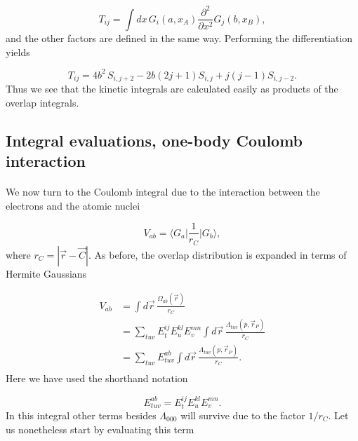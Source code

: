\documentclass[%
twoside,                 %
final,                   %
10pt]{article}
\begin{document}
\begin{equation}
 T_{ij} = \int dx \,G_i(a,x_A)\frac{\partial^2}{\partial x^2}G_j(b,x_B),
\end{equation}
and the other factors are defined in the same way. Performing the differentiation yields

\begin{equation}
 T_{ij} = 4b^2\,S_{i,j+2} - 2b(2j + 1)S_{i,j} + j(j-1)S_{i,j-2}.
\end{equation}
Thus we see that the kinetic integrals are calculated easily as products of the overlap integrals.



\subsection{Integral evaluations, one-body Coulomb interaction}

\paragraph{}

We now turn to the Coulomb integral due to the interaction between the electrons and the atomic nuclei

\begin{equation}
 V_{ab} = \langle G_a\vert\frac{1}{r_C}\vert G_b\rangle,
\end{equation}
where $r_C = |\vec r - \vec C|$. As before, the overlap distribution is expanded in terms of  Hermite Gaussians

\begin{equation}
\begin{split}
 V_{ab} & = \int d\vec r \,\frac{\Omega_{ab}(\vec r)}{r_C} \\
        & = \sum_{tuv}E^{ij}_t E^{kl}_u E^{mn}_v\int d\vec r \, \frac{\Lambda_{tuv}(p,\vec r_P)}{r_C} \\
        & = \sum_{tuv}E^{ab}_{tuv}\int d\vec r \, \frac{\Lambda_{tuv}(p,\vec r_P)}{r_C}. \\
\end{split}
\end{equation}
Here we have used the shorthand notation

\begin{equation}
 E^{ab}_{tuv} = E^{ij}_t E^{kl}_u E^{mn}_v.
\end{equation}
In this integral other terms besides $\Lambda_{000}$ will survive due to the factor $1/r_C$. Let us nonetheless start by evaluating this term
\end{document}
